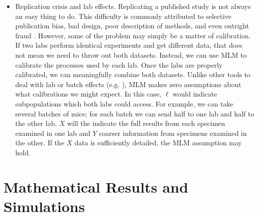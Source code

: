 \begin{itemize}
    \item Replication crisis and lab effects.  Replicating a published study is not always an easy thing to do.  This difficulty is commonly attributed to selective publication bias, bad design, poor description of methods, and even outright fraud \cite{baker2016reproducibility}.  However, some of the problem may simply be a matter of calibration.  If two labs perform identical experiments and get different data, that does not mean we need to throw out both datasets.  Instead, we can use MLM to calibrate the processes used by each lab.  Once the labs are properly calibrated, we can meaningfully combine both datasets.  Unlike other tools to deal with lab or batch effects (e.g. \cite{crow2018characterizing,johnson2007adjusting}), MLM makes zero assumptions about what calibrations we might expect.  In this case, $\ell$ would indicate subpopulations which both labs could access.  For example, we can take several batches of mice; for each batch we can send half to one lab and half to the other lab.  $X$ will the indicate the full results from each specimen examined in one lab and $Y$ coarser information from specimens examined in the other.  If the $X$ data is sufficiently detailed, the MLM assumption may hold.  
\end{itemize}

%                                                    

\section{Mathematical Results and Simulations}

\label{sec:simulations}



